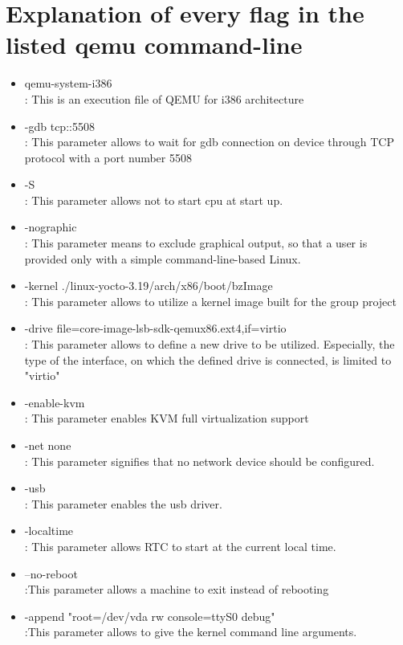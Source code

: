 \documentclass[journal,onecolumn]{IEEEtran}
\begin{document}
\section{Explanation of every flag in the listed qemu command-line}
\begin{itemize}
\item qemu-system-i386
\\: This is an execution file of QEMU for i386 architecture
\item -gdb tcp::5508
\\: This parameter allows to wait for gdb connection on device through  TCP protocol with a port number 5508
\item -S
\\: This parameter allows not to start cpu at start up.
\item -nographic
\\: This parameter means to exclude graphical output, so that a user is provided only with a simple command-line-based Linux.
\item -kernel ./linux-yocto-3.19/arch/x86/boot/bzImage
\\: This parameter allows to utilize a kernel image built for the group project
\item -drive file=core-image-lsb-sdk-qemux86.ext4,if=virtio
\\: This parameter allows to define a new drive to be utilized. Especially, the type of the interface, on which the defined drive is connected, is limited to "virtio"
\item -enable-kvm
\\: This parameter enables KVM full virtualization support
\item -net none
\\: This parameter signifies that no network device should be configured.
\item -usb
\\: This parameter enables the usb driver.
\item -localtime
\\: This parameter allows RTC to start at the current local time.
\item --no-reboot
\\:This parameter allows a machine to exit instead of rebooting
\item -append "root=/dev/vda rw console=ttyS0 debug"
\\:This parameter allows to give the kernel command line arguments.
\end{itemize}
\end{document}
